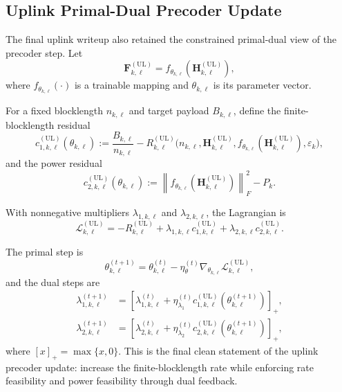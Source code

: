 \documentclass[11pt]{article}
\newcommand{\F}{\mathbf{F}}
\newcommand{\Hc}{\mathbf{H}}
\newcommand{\norm}[1]{\left\lVert #1 \right\rVert}
\newcommand{\UL}{\mathrm{UL}}
\begin{document}
\subsection{Uplink Primal-Dual Precoder Update}
The final uplink writeup also retained the constrained primal-dual view of the precoder step. Let
\begin{equation}
\F_{k,\ell}^{(\UL)} = f_{\theta_{k,\ell}}(\Hc_{k,\ell}^{(\UL)}),
\label{eq:ul-parameterization}
\end{equation}
where $f_{\theta_{k,\ell}}(\cdot)$ is a trainable mapping and $\theta_{k,\ell}$ is its parameter vector.

For a fixed blocklength $n_{k,\ell}$ and target payload $B_{k,\ell}$, define the finite-blocklength residual
\begin{equation}
c_{1,k,\ell}^{(\UL)}(\theta_{k,\ell})
:=
\frac{B_{k,\ell}}{n_{k,\ell}}
-
R_{k,\ell}^{(\UL)}
\bigl(
n_{k,\ell},
\Hc_{k,\ell}^{(\UL)},
f_{\theta_{k,\ell}}(\Hc_{k,\ell}^{(\UL)}),
\varepsilon_k
\bigr),
\label{eq:ul-residual-rate}
\end{equation}
and the power residual
\begin{equation}
c_{2,k,\ell}^{(\UL)}(\theta_{k,\ell})
:=
\norm{f_{\theta_{k,\ell}}(\Hc_{k,\ell}^{(\UL)})}_F^2 - P_k.
\label{eq:ul-residual-power}
\end{equation}

With nonnegative multipliers $\lambda_{1,k,\ell}$ and $\lambda_{2,k,\ell}$, the Lagrangian is
\begin{equation}
\mathcal{L}_{k,\ell}^{(\UL)}
=
-R_{k,\ell}^{(\UL)}
+ \lambda_{1,k,\ell} c_{1,k,\ell}^{(\UL)}
+ \lambda_{2,k,\ell} c_{2,k,\ell}^{(\UL)}.
\label{eq:ul-lagrangian}
\end{equation}

The primal step is
\begin{equation}
\theta_{k,\ell}^{(t+1)}
=
\theta_{k,\ell}^{(t)}
- \eta_{\theta}^{(t)}
\nabla_{\theta_{k,\ell}}
\mathcal{L}_{k,\ell}^{(\UL)},
\label{eq:ul-theta-update}
\end{equation}
and the dual steps are
\begin{align}
\lambda_{1,k,\ell}^{(t+1)}
&=
\left[
\lambda_{1,k,\ell}^{(t)}
+ \eta_{\lambda_1}^{(t)} c_{1,k,\ell}^{(\UL)}\!\left(\theta_{k,\ell}^{(t+1)}\right)
\right]_+,
\label{eq:ul-lambda1}
\\
\lambda_{2,k,\ell}^{(t+1)}
&=
\left[
\lambda_{2,k,\ell}^{(t)}
+ \eta_{\lambda_2}^{(t)} c_{2,k,\ell}^{(\UL)}\!\left(\theta_{k,\ell}^{(t+1)}\right)
\right]_+,
\label{eq:ul-lambda2}
\end{align}
where $[x]_+ = \max\{x,0\}$. This is the final clean statement of the uplink precoder update: increase the finite-blocklength rate while enforcing rate feasibility and power feasibility through dual feedback.
\end{document}
